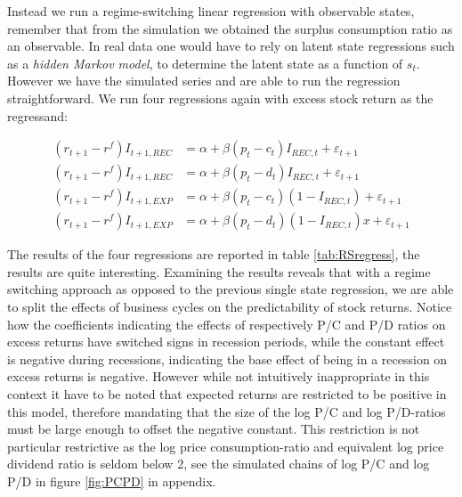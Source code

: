 





Instead we run a regime-switching linear regression with observable states, remember that from the simulation we obtained the surplus consumption ratio as an observable. In real data one would have to rely on latent state regressions such as a \textit{hidden Markov model}, to determine the latent state as a function of $s_t$.\\
However we have the simulated series and are able to run the regression straightforward. We run four regressions again with excess stock return as the regressand:

\begin{align*}
    \left(r_{t+1} - r^{f}\right) I_{t+1,REC} &=  \alpha + \beta \left( p_t - c_t \right) I_{REC,t} + \varepsilon_{t+1}\\
    \left(r_{t+1} - r^{f}\right)I_{t+1,REC} &=  \alpha + \beta \left( p_t - d_t \right) I_{REC,t} + \varepsilon_{t+1}\\
    \left(r_{t+1} - r^{f}\right)I_{t+1,EXP} &=  \alpha + \beta \left( p_t - c_t \right) \left( 1- I_{REC,t}\right)  + \varepsilon_{t+1}\\
    \left(r_{t+1} - r^{f}\right)I_{t+1,EXP} &=  \alpha + \beta \left( p_t - d_t \right) \left( 1- I_{REC,t}\right) x+ \varepsilon_{t+1}
\end{align*}

The results of the four regressions are reported in table \ref{tab:RSregress}, the results are quite interesting. Examining the results reveals that with a regime switching approach as opposed to the previous single state regression, we are able to split the effects of business cycles on the predictability of stock returns. Notice how the coefficients indicating the effects of respectively P/C and P/D ratios on excess returns have switched signs in recession periods, while the constant effect is negative during recessions, indicating the base effect of being in a recession on excess returns is negative. However while not intuitively inappropriate in this context it have to be noted that expected returns are restricted to be positive in this model, therefore mandating that the size of the log P/C and log P/D-ratios must be large enough to offset the negative constant. This restriction is not particular restrictive as the log price consumption-ratio and equivalent log price dividend ratio is seldom below 2, see the simulated chains of log P/C and log P/D in figure \ref{fig:PCPD} in appendix.\\


